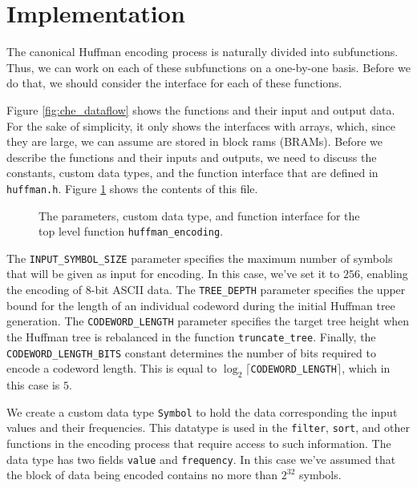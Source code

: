 \section{Implementation}
The canonical Huffman encoding process is naturally divided into subfunctions. Thus, we can work on each of these subfunctions on a one-by-one basis. Before we do that, we should consider the interface for each of these functions. 

Figure \ref{fig:che_dataflow} shows the functions and their input and output data. For the sake of simplicity, it only shows the interfaces with arrays, which, since they are large, we can assume are stored in block rams (BRAMs). Before we describe the functions and their inputs and outputs, we need to discuss the constants, custom data types, and the function interface that are defined in \lstinline{huffman.h}. Figure \ref{fig:huffman_h} shows the contents of this file. 

\begin{figure}

\caption{  The parameters, custom data type, and function interface for the top level function \lstinline{huffman_encoding}.  }
\label{fig:huffman_h}
\end{figure}

The \lstinline{INPUT_SYMBOL_SIZE} parameter specifies the maximum number of symbols that will be given as input for encoding.  In this case, we've set it to $256$, enabling the encoding of 8-bit ASCII data. The \lstinline{TREE_DEPTH} parameter specifies the upper bound for the length of an individual codeword during the initial Huffman tree generation. The \lstinline{CODEWORD_LENGTH} parameter specifies the target tree height when the Huffman tree is rebalanced in the function \lstinline{truncate_tree}. Finally, the \lstinline{CODEWORD_LENGTH_BITS} constant determines the number of bits required to encode a codeword length. This is equal to $\log_2 \lceil $\lstinline{CODEWORD_LENGTH}$\rceil$, which in this case is $5$.

We create a custom data type \lstinline{Symbol} to hold the data corresponding the input values and their frequencies. This datatype is used in the \lstinline{filter}, \lstinline{sort}, and other functions in the encoding process that require access to such information. The data type has two fields \lstinline{value} and \lstinline{frequency}.  In this case we've assumed that the block of data being encoded contains no more than $2^{32}$ symbols.

